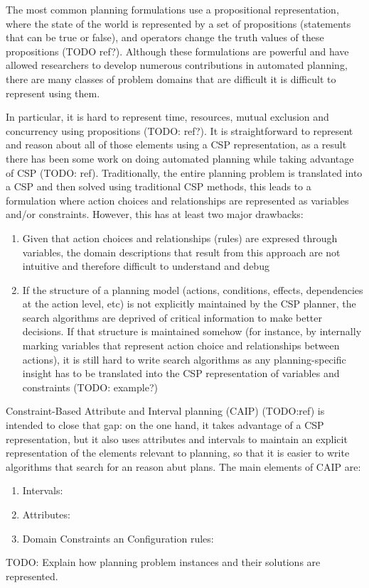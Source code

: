 The most common planning formulations use a propositional representation, where the state of the world is represented by a set of propositions (statements that can be true or false), and operators change the truth values of these propositions (TODO ref?). Although these formulations are powerful and have allowed researchers to develop numerous contributions in automated planning, there are many classes of problem domains that are difficult it is difficult to represent using them. 

In particular, it is hard to represent time, resources, mutual exclusion and concurrency using propositions (TODO: ref?).  It is straightforward to represent and reason about all of those elements using a CSP representation, as a result there has been some work on doing automated planning while taking advantage of CSP  (TODO: ref).  Traditionally, the entire planning problem is translated into a CSP and then solved using traditional CSP methods, this leads to a formulation where action choices and relationships are represented as variables and/or constraints. However, this has at least two major drawbacks:
\begin{enumerate}
	\item Given that action choices and relationships (rules) are expresed through variables, the domain descriptions that result from this approach are not intuitive and therefore difficult to understand and debug
	\item If the structure of a planning model (actions, conditions, effects, dependencies at the action level, etc) is not explicitly maintained by the CSP planner, the search algorithms are deprived of critical information to make better decisions. If that structure is maintained somehow (for instance, by internally marking variables that represent action choice and relationships between actions), it is still hard to write search algorithms as any planning-specific insight has to be translated into the CSP representation of variables and constraints  (TODO: example?)
\end{enumerate}


Constraint-Based Attribute and Interval planning (CAIP) (TODO:ref) is intended to close that gap: on the one hand, it takes advantage of a CSP representation, but it also uses attributes and intervals to maintain an explicit representation of the elements relevant to planning, so that it is easier to write algorithms that search for an reason abut plans. The main elements of CAIP are:

\begin{enumerate}
	\item Intervals:
	\item Attributes:
	\item Domain Constraints an Configuration rules:
\end{enumerate}

TODO: Explain how planning problem instances and their solutions are represented.

